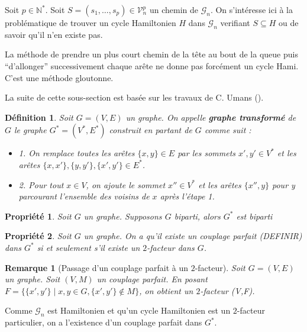 \documentclass[french,a4paper]{article}
\newtheorem{definition}{Définition}[section]
\newtheorem{property}{Propriété}[section]
\newtheorem{remark}{Remarque}[section]
\begin{document}
Soit $p \in \mathbb{N}^*$. Soit $S=(s_1,\dots,s_p) \in \mathcal{V}_{n}^{p}$ un chemin de $\mathcal{G}_n$.
On s'intéresse ici à la problématique de trouver un cycle Hamiltonien $H$ dans $\mathcal{G}_n$ verifiant $S \subseteq H$ ou de savoir qu'il n'en existe pas.


\bigskip

La méthode de prendre un plus court chemin de la tête au bout de la queue puis ``d'allonger'' successivement chaque arête ne donne pas forcément un cycle Hami. C'est une méthode gloutonne.

\bigskip

La suite de cette sous-section est basée sur les travaux de C. Umans (\cite{Umans1996AnAF}).

\begin{definition}
Soit $G=(V,E)$ un graphe.
On appelle \textbf{graphe transformé} de $G$ le graphe $G^*=(V^*,E^*)$ construit en partant de $G$ comme suit :

\begin{itemize}
\item 1. On remplace toutes les arêtes $\{x,y\} \in E$ par les sommets $x',y' \in V^*$ et les arêtes $\{x,x'\}, \{y,y'\}, \{x',y'\} \in E^*$.
\item 2. Pour tout $x \in V$, on ajoute le sommet $x'' \in V^*$ et les arêtes $\{x'',y\}$ pour y parcourant l'ensemble des voisins de $x$ après l'étape 1.
\end{itemize}
\end{definition}

\begin{property}
Soit $G$ un graphe.
Supposons $G$ biparti, alors $G^*$ est biparti
\end{property}

\begin{property}
Soit $G$ un graphe.
On a qu'il existe un couplage parfait (DEFINIR) dans $G^*$ si et seulement s'il existe un $2$-facteur dans $G$.
\end{property}

\begin{remark}[Passage d'un couplage parfait à un $2$-facteur]
Soit $G=(V,E)$ un graphe.
Soit $(V,M)$ un couplage parfait.
En posant $F=\{\{x',y'\} \mid x,y \in G, \{x',y'\} \notin M\}$, on obtient un $2$-facteur (V,F).
\end{remark}

Comme $\mathcal{G}_n$ est Hamiltonien et qu'un cycle Hamiltonien est un $2$-facteur particulier, on a l'existence d'un couplage parfait dans $G^*$.
\end{document}
